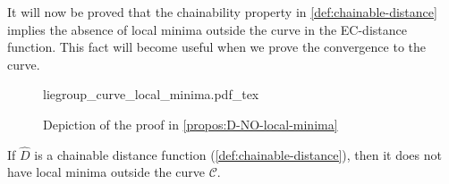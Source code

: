 It will now be proved that the chainability property in \cref{def:chainable-distance} implies the absence of local minima outside the curve in the EC-distance function. This fact will become useful when we prove the convergence to the curve.
\begin{figure}[ht]
    \centering
    \def\svgwidth{.8\linewidth}
    {liegroup_curve_local_minima.pdf_tex}
    \caption{Depiction of the proof in \cref{propos:D-NO-local-minima}}
    \label{fig:distance-without-local-minima}
\end{figure}
\begin{proposition}\label{propos:D-NO-local-minima}
    If $\widehat{D}$ is a chainable distance function (\cref{def:chainable-distance}), then it does not have local minima outside the curve $\mathcal{C}$.
\end{proposition}
